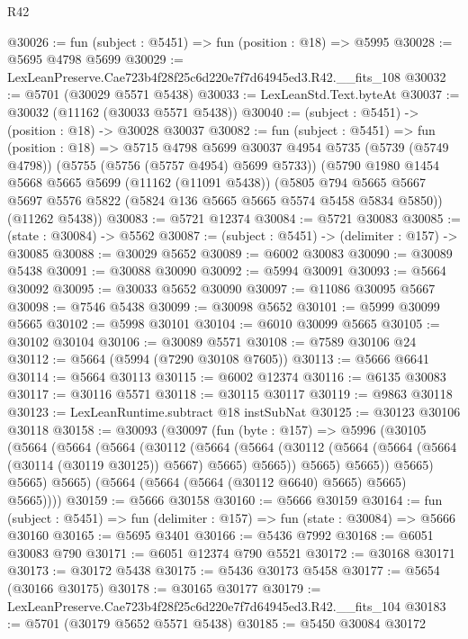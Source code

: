 \begin{lexlean}{R42}
\begin{coremodule}
@30026 := fun (subject : @5451) => fun (position : @18) => @5995
@30028 := @5695 @4798 @5699
@30029 := LexLeanPreserve.Cae723b4f28f25c6d220e7f7d64945ed3.R42.__fits_108
@30032 := @5701 (@30029 @5571 @5438)
@30033 := LexLeanStd.Text.byteAt
@30037 := @30032 (@11162 (@30033 @5571 @5438))
@30040 := (subject : @5451) -> (position : @18) -> @30028 @30037
@30082 := fun (subject : @5451) =>
  fun (position : @18) =>
  @5715
    @4798
    @5699
    @30037
    @4954
    @5735
    (@5739 (@5749 @4798))
    (@5755 (@5756 (@5757 @4954) @5699 @5733))
    (@5790
      @1980
      @1454
      @5668
      @5665
      @5699
      (@11162 (@11091 @5438))
      (@5805 @794 @5665 @5667 @5697 @5576 @5822 (@5824 @136 @5665 @5665 @5574 @5458 @5834 @5850))
      (@11262 @5438))
@30083 := @5721 @12374
@30084 := @5721 @30083
@30085 := (state : @30084) -> @5562
@30087 := (subject : @5451) -> (delimiter : @157) -> @30085
@30088 := @30029 @5652
@30089 := @6002 @30083
@30090 := @30089 @5438
@30091 := @30088 @30090
@30092 := @5994 @30091
@30093 := @5664 @30092
@30095 := @30033 @5652 @30090
@30097 := @11086 @30095 @5667
@30098 := @7546 @5438
@30099 := @30098 @5652
@30101 := @5999 @30099 @5665
@30102 := @5998 @30101
@30104 := @6010 @30099 @5665
@30105 := @30102 @30104
@30106 := @30089 @5571
@30108 := @7589 @30106 @24
@30112 := @5664 (@5994 (@7290 @30108 @7605))
@30113 := @5666 @6641
@30114 := @5664 @30113
@30115 := @6002 @12374
@30116 := @6135 @30083
@30117 := @30116 @5571
@30118 := @30115 @30117
@30119 := @9863 @30118
@30123 := LexLeanRuntime.subtract @18 instSubNat
@30125 := @30123 @30106 @30118
@30158 := @30093
    (@30097
      (fun (byte : @157) =>
      @5996
        (@30105
          (@5664
            (@5664
              (@5664
                (@30112
                  (@5664
                    (@5664
                      (@30112 (@5664 (@5664 (@5664 (@30114 (@30119 @30125)) @5667) @5665) @5665))
                      @5665)
                    @5665))
                @5665)
              @5665)
            @5665)
          (@5664 (@5664 (@5664 (@30112 @6640) @5665) @5665) @5665))))
@30159 := @5666 @30158
@30160 := @5666 @30159
@30164 := fun (subject : @5451) => fun (delimiter : @157) => fun (state : @30084) => @5666 @30160
@30165 := @5695 @3401
@30166 := @5436 @7992
@30168 := @6051 @30083 @790
@30171 := @6051 @12374 @790 @5521
@30172 := @30168 @30171
@30173 := @30172 @5438
@30175 := @5436 @30173 @5458
@30177 := @5654 (@30166 @30175)
@30178 := @30165 @30177
@30179 := LexLeanPreserve.Cae723b4f28f25c6d220e7f7d64945ed3.R42.__fits_104
@30183 := @5701 (@30179 @5652 @5571 @5438)
@30185 := @5450 @30084 @30172

\end{coremodule}
\end{lexlean}
